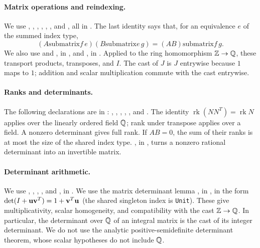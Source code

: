 \begin{mergedproofsection}
\paragraph{Matrix operations and reindexing.}
\uses{}
We use , ,
, ,
, , and
, all in .
The last identity says that, for
an equivalence $e$ of the summed index type,
\[
 (A\mathbin{\mathrm{submatrix}}f\,e)
 (B\mathbin{\mathrm{submatrix}}e\,g)
       =(AB)\mathbin{\mathrm{submatrix}}f\,g.
\]
We also use  and
, in
, and , in
. Applied to the ring homomorphism
${\mathbb Z}\to{\mathbb Q}$, these transport products, transposes, and $I$.
The cast of $J$ is $J$ entrywise because $1$ maps to $1$; addition
and scalar multiplication commute with the cast entrywise.

\paragraph{Ranks and determinants.}
\uses{}
The following declarations are in
:
, ,
, ,
, and
.
The identity $\operatorname{rk}(NN^T)=\operatorname{rk}N$ applies over
the linearly ordered field ${\mathbb Q}$; rank under transpose applies over
a field. A nonzero determinant gives full rank. If $AB=0$, the sum
of their ranks is at most the size of the shared index type.
, in
, turns a nonzero
rational determinant into an invertible matrix.

\paragraph{Determinant arithmetic.}
\uses{}
We use , ,
, , and , in
.
We use the matrix determinant lemma
, in
, in the form
$\det(I+{\mathbf u}{\mathbf v}^T)=1+{\mathbf v}^T{\mathbf u}$ (the shared singleton index is
\texttt{Unit}). These give multiplicativity, scalar homogeneity,
and compatibility with the cast ${\mathbb Z}\to{\mathbb Q}$. In particular, the
determinant over ${\mathbb Q}$ of an integral matrix is the cast of its
integer determinant. We do not use the analytic
positive-semidefinite determinant theorem, whose scalar hypotheses
do not include ${\mathbb Q}$.


\end{mergedproofsection}
